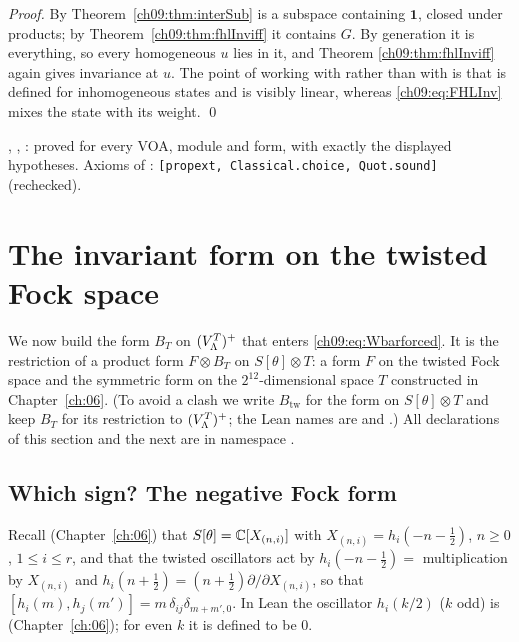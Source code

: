 \noindent\emph{Proof.} By Theorem~\ref{ch09:thm:interSub}  is a subspace containing
$\mathbf1$, closed under products; by Theorem~\ref{ch09:thm:fhlInviff} it contains $G$. By
generation it is everything, so every homogeneous $u$ lies in it, and Theorem
\ref{ch09:thm:fhlInviff} again gives invariance at $u$. The point of working with
 rather than with  is that  is defined for
inhomogeneous states and is visibly linear, whereas \eqref{ch09:eq:FHLInv} mixes the state with
its weight. \qed

\begin{status}
, , : proved for every VOA,
module and form, with exactly the displayed hypotheses. Axioms of :
\texttt{[propext, Classical.choice, Quot.sound]} (rechecked).
\end{status}

\section{The invariant form on the twisted Fock space}\label{ch09:sec:fock}

We now build the form $B_T$ on $(V_{\Lambda}^{T})^{+}$ that enters \eqref{ch09:eq:Wbarforced}. It is the
restriction of a product form $F\otimes B_{T}$ on $S[\theta]\otimes T$: a form $F$ on the twisted
Fock space and the symmetric form  on the $2^{12}$-dimensional space $T$ constructed
in Chapter~\ref{ch:06}. (To avoid a clash we write $B_{\mathrm{tw}}$ for the form on
$S[\theta]\otimes T$ and keep $B_T$ for its restriction to $(V_{\Lambda}^{T})^{+}$; the Lean names are
 and .) All declarations of this section and the next are in
namespace .

\subsection{Which sign? The negative Fock form}

Recall (Chapter~\ref{ch:06}) that $S[\theta]={\mathbb{C}}[X_{(n,i)}]$ with $X_{(n,i)}=h_i(-n-\frac12)$,
$n\ge0$, $1\le i\le r$, and that the twisted oscillators act by
$h_i(-n-\tfrac12)=$ multiplication by $X_{(n,i)}$ and $h_i(n+\tfrac12)=(n+\tfrac12)\partial/\partial X_{(n,i)}$,
so that $[h_i(m),h_j(m')]=m\,\delta_{ij}\delta_{m+m',0}$. In Lean the oscillator $h_i(k/2)$ ($k$ odd)
is  (Chapter~\ref{ch:06}); for even $k$ it is defined to be $0$.

